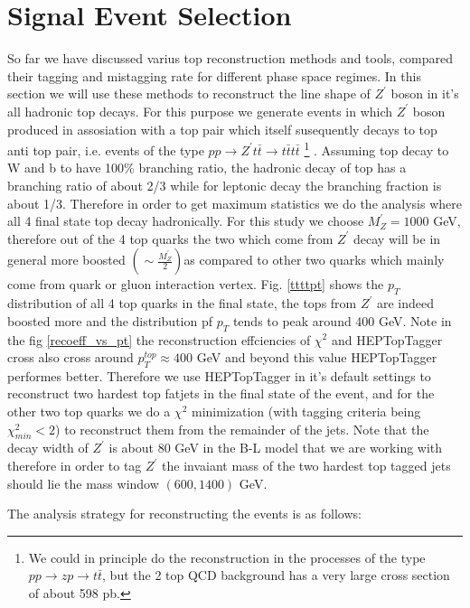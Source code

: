 \documentclass[12pt,a4paper]{article}		%
\begin{document}
\section{Signal Event Selection}
So far we have discussed varius top reconstruction methods and tools, compared their tagging and mistagging rate for different phase space regimes. In this section we will use these methods to reconstruct the line shape of $Z^\prime$ boson in it's all hadronic top decays. For this purpose we generate events in which $Z^\prime$ boson  produced in assosiation with a top pair which itself susequently decays to top anti top pair, i.e. events of the type $ pp \to Z^\prime t \bar{t} \to t \bar{t}t \bar{t}$ \footnote{ We could in principle do the reconstruction in the processes of the type $pp \to zp \to t \bar{t}$, but the 2 top QCD background has a very large cross section of about 598 pb.} . Assuming top decay to W and b to have 100\% branching ratio, the hadronic decay of top has a branching ratio of about 2/3 while for leptonic decay the branching fraction is about 1/3. Therefore in order to get maximum statistics we do the analysis where all 4 final state top decay hadronically. For this study we choose $M_Z^\prime = 1000$ GeV, therefore out of the 4 top quarks the two which come from $Z^\prime$ decay will be in general more boosted $( \sim \frac{ M_Z^\prime}{2}  )$as compared to other two quarks which mainly come from quark or gluon interaction vertex. Fig. \ref{ttttpt} shows the $p_T$ distribution of all 4 top quarks in the final state, the tops from $Z^\prime$ are indeed boosted more and the distribution pf $p_T$ tends to peak around 400 GeV. Note in the fig \ref{recoeff_vs_pt} the reconstruction effciencies of $\chi^2$ and HEPTopTagger cross also cross around $p_T^{top} \approx 400$ GeV and beyond this value HEPTopTagger performes better. Therefore we use HEPTopTagger in it's default settings to reconstruct two hardest top fatjets in the final state of the event, and for the other two top quarks we do a $\chi^2$ minimization (with tagging criteria being $\chi^2_{min}<2$) to reconstruct them from the remainder of the jets. Note that the decay width of $Z^\prime$ is about 80 GeV in the B-L model that we are working with therefore in order to tag $Z^\prime$ the invaiant mass of the two hardest top tagged jets should lie the mass window $(600,1400)$ GeV. 

\newpage
The analysis strategy for reconstructing the events is as follows:
\end{document}
